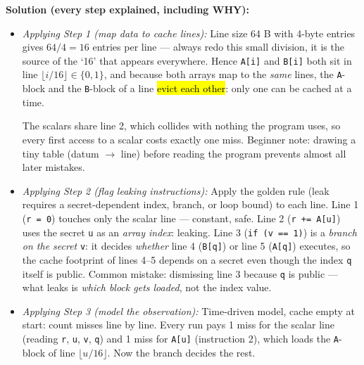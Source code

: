 \documentclass[12pt, a4paper]{article}
\newcommand{\imp}[1]{\hl{#1}}                       %
\begin{document}
\textbf{Solution (every step explained, including WHY):}
\begin{itemize}
    \item \textit{Applying Step 1 (map data to cache lines):} Line size 64 B with 4-byte entries gives $64/4 = 16$ entries per line --- always redo this small division, it is the source of the `16' that appears everywhere.
    Hence \texttt{A[i]} and \texttt{B[i]} both sit in line $\lfloor i/16 \rfloor \in \{0,1\}$, and because both arrays map to the \emph{same} lines, the \texttt{A}-block and the \texttt{B}-block of a line \imp{evict each other}: only one can be cached at a time.

    The scalars share line 2, which collides with nothing the program uses, so every first access to a scalar costs exactly one miss. Beginner note: drawing a tiny table (datum $\rightarrow$ line) before reading the program prevents almost all later mistakes.
    \item \textit{Applying Step 2 (flag leaking instructions):} Apply the golden rule (leak requires a secret-dependent index, branch, or loop bound) to each line. Line 1 (\texttt{r = 0}) touches only the scalar line --- constant, safe.
    Line 2 (\texttt{r += A[u]}) uses the secret \texttt{u} as an \emph{array index}: leaking. Line 3 (\texttt{if (v == 1)}) is a \emph{branch on the secret} \texttt{v}: it decides \emph{whether} line 4 (\texttt{B[q]}) or line 5 (\texttt{A[q]}) executes, so the cache footprint of lines 4--5 depends on a secret even though the index \texttt{q} itself is public.
    Common mistake: dismissing line 3 because \texttt{q} is public --- what leaks is \emph{which block gets loaded}, not the index value.
    \item \textit{Applying Step 3 (model the observation):} Time-driven model, cache empty at start: count misses line by line. Every run pays 1 miss for the scalar line (reading \texttt{r}, \texttt{u}, \texttt{v}, \texttt{q}) and 1 miss for \texttt{A[u]} (instruction 2), which loads the \texttt{A}-block of line $\lfloor u/16 \rfloor$. Now the branch decides the rest.
\end{itemize}
\end{document}
